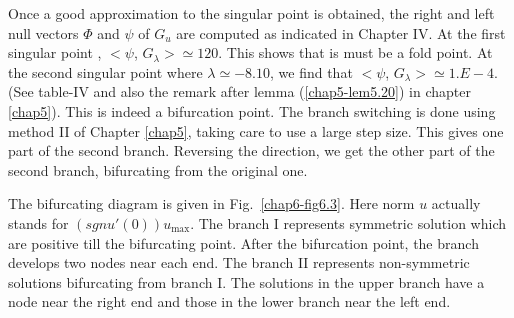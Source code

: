 Once a good approximation to the singular point is obtained, the right
and left null vectors $\Phi$  and $\psi $ of $G_u$ are computed as
indicated in Chapter IV. At the first singular point , $<\psi$,
$G_\lambda > \simeq 120$. This shows that is must be a fold point. At
the second singular point where $\lambda \simeq -8.10$, we find that
$<\psi$, $G_\lambda >\simeq 1.E-4$. (See table-IV and also the remark
after lemma (\ref{chap5-lem5.20}) in chapter \ref{chap5}). This is
indeed a bifurcation 
point. The branch switching is done using method II of Chapter \ref{chap5},
taking care to use a large step size. This gives one part of the
second branch. Reversing the direction, we get the other part of the
second branch, bifurcating from the original one. 

The bifurcating diagram is given in Fig.~\ref{chap6-fig6.3}. Here norm
$u$ actually 
stands for $(sgn u' (0))u_{\max}$. The branch I represents symmetric
solution which are positive till the bifurcating point. After the
bifurcation point, the branch develops two nodes near each end. The
branch II represents non-symmetric solutions bifurcating from branch
I. The solutions in the upper branch have a node near the right end
and those in the lower branch near the left end. 


